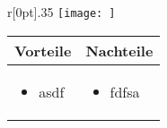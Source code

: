 \begin{wrapfigure}{r}[0pt]{.35\textwidth}
 \vspace{-15pt}
\texttt{[image: ]}
 \vspace{-15pt}
\end{wrapfigure}





\usepackage{listings}


\begin{tabularx}{\linewidth}{X|X}
\textbf{Vorteile} & \textbf{Nachteile}\\
\hline
\vspace{-0.5cm}
\begin{itemize}[leftmargin=*]
    \item asdf
\end{itemize}
& 
\vspace{-0.5cm}
\begin{itemize}[leftmargin=*]
    \item fdfsa
\end{itemize}
\end{tabularx}